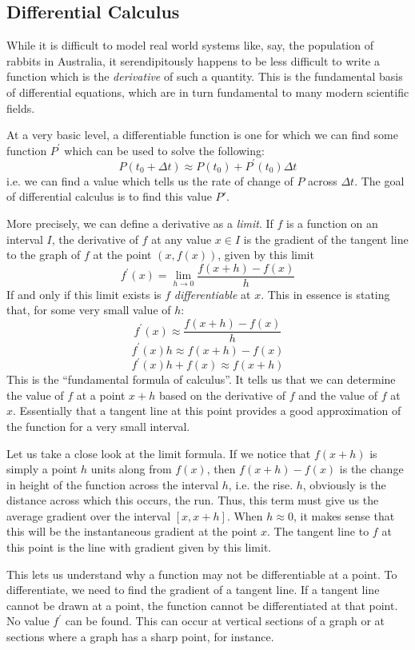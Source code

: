 \documentclass[12pt]{report}
\begin{document}
\begin{flushleft}
\section*{Differential Calculus}
While it is difficult to model real world systems like, say, the population
of rabbits in Australia, it serendipitously happens to be less difficult to
write a function which is the \textit{derivative} of such a quantity. This is
the fundamental basis of differential equations, which are in turn fundamental
to many modern scientific fields.

\bigskip
At a very basic level, a differentiable function is one for which we can find
some function \(P^\prime\) which can be used to solve the following:
\[P(t_0 + \Delta t) \approx P(t_0) + P^\prime(t_0)\Delta t\]
i.e. we can find a value which tells us the rate of change of \(P\) across 
\(\Delta t\). The goal of differential calculus is to find this value 
\(P\prime\).

\bigskip
More precisely, we can define a derivative as a \textit{limit}. If \(f\) is a
function on an interval \(I\), the derivative of \(f\) at any value \(x \in I\)
is the gradient of the tangent line to the graph of \(f\) at the point 
\((x, f(x))\), given by this limit
\[f^\prime(x) = \lim_{h\rightarrow0}\frac{f(x + h) - f(x)}{h}\]
If and only if this limit exists is \(f\) \textit{differentiable} at \(x\). 
This in essence is stating that, for some very small value of \(h\):
\[f^\prime(x) \approx \frac{f(x + h) - f(x)}{h}\]
\[f^\prime(x)h \approx f(x + h) - f(x)\]
\[f^\prime(x)h + f(x) \approx f(x + h)\]
This is the ``fundamental formula of calculus''. It tells us that we can 
determine the value of \(f\) at a point \(x + h\) based on the derivative of
\(f\) and the value of \(f\) at \(x\). Essentially that a tangent line at this
point provides a good approximation of the function for a very small interval.

\bigskip
Let us take a close look at the limit formula. If we notice that \(f(x + h)\)
is simply a point \(h\) units along from \(f(x)\), then \(f(x + h) - f(x)\) is
the change in height of the function across the interval \(h\), i.e. the rise.
\(h\), obviously is the distance across which this occurs, the run. Thus, this
term must give us the average gradient over the interval \([x, x + h]\). When
\(h \approx 0\), it makes sense that this will be the instantaneous gradient at
the point \(x\). The tangent line to \(f\) at this point is the line with 
gradient given by this limit.

\bigskip
This lets us understand why a function may not be differentiable at a point.
To differentiate, we need to find the gradient of a tangent line. If a tangent
line cannot be drawn at a point, the function cannot be differentiated at that
point. No value \(f^\prime\) can be found. This can occur at vertical sections 
of a graph or at sections where a graph has a sharp point, for instance.


\end{flushleft}
\end{document}
